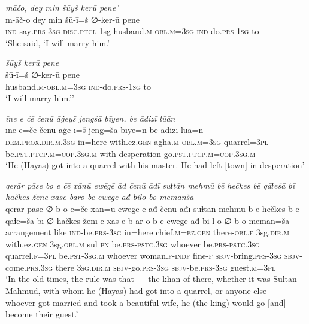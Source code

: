\ea \label{ŽH.59}
\textit{māčo, dey min šūyš kerū pene’} \\ 
\gll m-āč-o dey min šū-ī=š ∅-ker-ū pene \\ 
 \textsc{ind-}say\textsc{.prs}\textsc{-3sg} \textsc{disc.ptcl} 1sg husband\textsc{.m}\textsc{-obl}\textsc{.m}\textsc{=3sg} \textsc{ind-}do\textsc{.prs}\textsc{-1sg} to \\ 
\glt `She said, ‘I will marry him.'
\z 
 
\ea \label{ŽH.60}
\textit{šūyš kerū pene} \\ 
\gll šū-ī=š ∅-ker-ū pene \\ 
 husband\textsc{.m}\textsc{-obl}\textsc{.m}\textsc{=3sg} \textsc{ind-}do\textsc{.prs}\textsc{-1sg} to \\ 
\glt `I will marry him.’'
\z 
 
\ea \label{ŽH.62}
\textit{īne e čē čenū āġeyš jengšā bīyen, be ādizī lūān} \\ 
\gll īne e=čē čenū āġe-ī=š jeng=šā bīye=n be ādizī lūā=n \\ 
 \textsc{dem.prox}\textsc{.dir}\textsc{.m}\textsc{.3sg} in=here with.ez\textsc{.gen} agha\textsc{.m}\textsc{-obl}\textsc{.m}\textsc{=3sg} quarrel\textsc{=3pl} be\textsc{.pst}\textsc{.ptcp}\textsc{.m}\textsc{=cop}\textsc{.3sg}\textsc{.m} with desperation go\textsc{.pst}\textsc{.ptcp}\textsc{.m}\textsc{=cop}\textsc{.3sg}\textsc{.m} \\ 
\glt `He (Hayas) got into a quarrel with his master. He had left [town] in desperation'
\z 
 
\ea \label{ŽH.64}
\textit{qerār pāse bo e čē xānū ewēgē āđ čenū āđī suɫtān mehmū bē hečkes bē qāɫešā bī hāčkes ženē xāse bāro bē ewēge āđ bilo bo mēmānšā} \\ 
\gll qerār pāse ∅-b-o e=čē xān=ū ewēge-ē āđ čenū āđī suɫtān mehmū b-ē hečkes b-ē qāɫe=šā bī-∅ hāčkes ženī-ē xās-e b-ār-o b-ē ewēge āđ bi-l-o ∅-b-o mēmān=šā \\ 
 arrangement like \textsc{ind-}be\textsc{.prs}\textsc{-3sg} in=here chief\textsc{.m}\textsc{=ez}\textsc{.gen} there\textsc{-obl}\textsc{\textsc{.f}} 3sg\textsc{.dir}\textsc{.m} with.ez\textsc{.gen} 3sg\textsc{.obl}\textsc{.m} sul \textsc{pn} be\textsc{.prs}\textsc{-pstc}\textsc{.3sg} whoever be\textsc{.prs}\textsc{-pstc}\textsc{.3sg} quarrel\textsc{\textsc{.f}}\textsc{=3pl} be\textsc{.pst}\textsc{-3sg}\textsc{.m} whoever woman\textsc{\textsc{.f}}\textsc{-indf} fine\textsc{-f} \textsc{sbjv-}bring\textsc{.prs}\textsc{-3sg} \textsc{sbjv-}come\textsc{.prs}\textsc{.3sg} there \textsc{3sg}\textsc{.dir}\textsc{.m} \textsc{sbjv-}go\textsc{.prs}\textsc{-3sg} \textsc{sbjv-}be\textsc{.prs}\textsc{-3sg} guest\textsc{.m}\textsc{=3pl} \\ 
\glt `In the old times, the rule was that — the khan of there, whether it was Sultan Mahmud, with whom he (Hayas) had got into a quarrel, or anyone else— whoever got married and took a beautiful wife, he (the king) would go [and] become their guest.'
\z 
 
